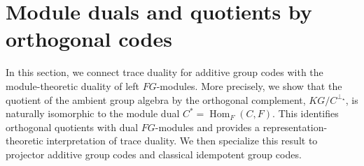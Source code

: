 \documentclass[11pt]{article}
\newtheorem{remark}[theorem]{Remark}
\begin{document}




\section{Module duals and quotients by orthogonal codes}

In this section, we connect trace duality for additive group codes with the
module-theoretic duality of left $FG$-modules. More precisely, we show that
the quotient of the ambient group algebra by the orthogonal complement,
$KG/C^{\perp_\star}$, is naturally isomorphic to the module dual
$C^*=\operatorname{Hom}_F(C,F)$. This identifies orthogonal quotients with
dual $FG$-modules and provides a representation-theoretic interpretation of
trace duality. We then specialize this result to projector additive group
codes and classical idempotent group codes.
\end{document}
